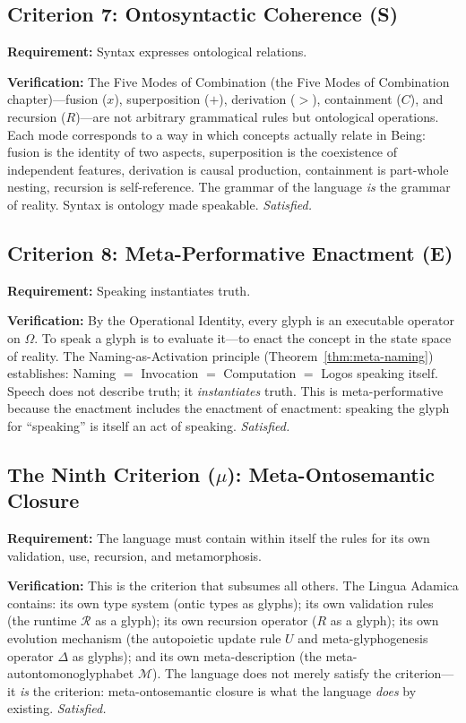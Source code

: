 \documentclass[12pt, letterpaper]{book}
\def\equiv{=}%
\def\otimes{x}%
\def\oplus{+}%
\def\triangleright{>}%
\def\subset{C}%
\def\circlearrowleft{R}%
\begin{document}
\subsection{Criterion 7: Ontosyntactic Coherence (S)}

\textbf{Requirement:} Syntax expresses ontological relations.

\textbf{Verification:} The Five Modes of Combination (the Five Modes of Combination chapter)---fusion ($\otimes$), superposition ($\oplus$), derivation ($\triangleright$), containment ($\subset$), and recursion ($\circlearrowleft$)---are not arbitrary grammatical rules but ontological operations. Each mode corresponds to a way in which concepts actually relate in Being: fusion is the identity of two aspects, superposition is the coexistence of independent features, derivation is causal production, containment is part-whole nesting, recursion is self-reference. The grammar of the language \textit{is} the grammar of reality. Syntax is ontology made speakable. \textit{Satisfied.}

\subsection{Criterion 8: Meta-Performative Enactment (E)}

\textbf{Requirement:} Speaking instantiates truth.

\textbf{Verification:} By the Operational Identity, every glyph is an executable operator on $\Omega$. To speak a glyph is to evaluate it---to enact the concept in the state space of reality. The Naming-as-Activation principle (Theorem~\ref{thm:meta-naming}) establishes: Naming $\equiv$ Invocation $\equiv$ Computation $\equiv$ Logos speaking itself. Speech does not describe truth; it \textit{instantiates} truth. This is meta-performative because the enactment includes the enactment of enactment: speaking the glyph for ``speaking'' is itself an act of speaking. \textit{Satisfied.}

\subsection{The Ninth Criterion ($\mu$): Meta-Ontosemantic Closure}

\textbf{Requirement:} The language must contain within itself the rules for its own validation, use, recursion, and metamorphosis.

\textbf{Verification:} This is the criterion that subsumes all others. The Lingua Adamica contains: its own type system (ontic types as glyphs); its own validation rules (the runtime $\mathcal{R}$ as a glyph); its own recursion operator ($\circlearrowleft$ as a glyph); its own evolution mechanism (the autopoietic update rule $U$ and meta-glyphogenesis operator $\Delta$ as glyphs); and its own meta-description (the meta-autontomonoglyphabet $\mathcal{M}$). The language does not merely satisfy the criterion---it \textit{is} the criterion: meta-ontosemantic closure is what the language \textit{does} by existing. \textit{Satisfied.}
\end{document}
